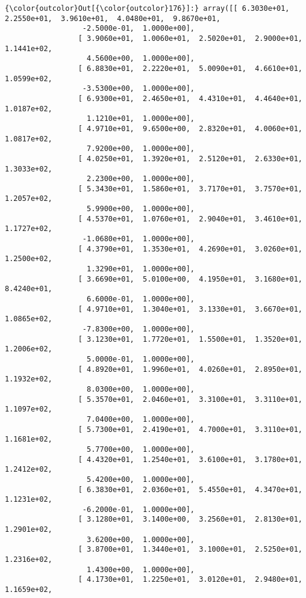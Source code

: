 \documentclass[11pt]{article}
\begin{document}
\begin{Verbatim}[commandchars=\\\{\}]
{\color{outcolor}Out[{\color{outcolor}176}]:} array([[ 6.3030e+01,  2.2550e+01,  3.9610e+01,  4.0480e+01,  9.8670e+01,
                  -2.5000e-01,  1.0000e+00],
                 [ 3.9060e+01,  1.0060e+01,  2.5020e+01,  2.9000e+01,  1.1441e+02,
                   4.5600e+00,  1.0000e+00],
                 [ 6.8830e+01,  2.2220e+01,  5.0090e+01,  4.6610e+01,  1.0599e+02,
                  -3.5300e+00,  1.0000e+00],
                 [ 6.9300e+01,  2.4650e+01,  4.4310e+01,  4.4640e+01,  1.0187e+02,
                   1.1210e+01,  1.0000e+00],
                 [ 4.9710e+01,  9.6500e+00,  2.8320e+01,  4.0060e+01,  1.0817e+02,
                   7.9200e+00,  1.0000e+00],
                 [ 4.0250e+01,  1.3920e+01,  2.5120e+01,  2.6330e+01,  1.3033e+02,
                   2.2300e+00,  1.0000e+00],
                 [ 5.3430e+01,  1.5860e+01,  3.7170e+01,  3.7570e+01,  1.2057e+02,
                   5.9900e+00,  1.0000e+00],
                 [ 4.5370e+01,  1.0760e+01,  2.9040e+01,  3.4610e+01,  1.1727e+02,
                  -1.0680e+01,  1.0000e+00],
                 [ 4.3790e+01,  1.3530e+01,  4.2690e+01,  3.0260e+01,  1.2500e+02,
                   1.3290e+01,  1.0000e+00],
                 [ 3.6690e+01,  5.0100e+00,  4.1950e+01,  3.1680e+01,  8.4240e+01,
                   6.6000e-01,  1.0000e+00],
                 [ 4.9710e+01,  1.3040e+01,  3.1330e+01,  3.6670e+01,  1.0865e+02,
                  -7.8300e+00,  1.0000e+00],
                 [ 3.1230e+01,  1.7720e+01,  1.5500e+01,  1.3520e+01,  1.2006e+02,
                   5.0000e-01,  1.0000e+00],
                 [ 4.8920e+01,  1.9960e+01,  4.0260e+01,  2.8950e+01,  1.1932e+02,
                   8.0300e+00,  1.0000e+00],
                 [ 5.3570e+01,  2.0460e+01,  3.3100e+01,  3.3110e+01,  1.1097e+02,
                   7.0400e+00,  1.0000e+00],
                 [ 5.7300e+01,  2.4190e+01,  4.7000e+01,  3.3110e+01,  1.1681e+02,
                   5.7700e+00,  1.0000e+00],
                 [ 4.4320e+01,  1.2540e+01,  3.6100e+01,  3.1780e+01,  1.2412e+02,
                   5.4200e+00,  1.0000e+00],
                 [ 6.3830e+01,  2.0360e+01,  5.4550e+01,  4.3470e+01,  1.1231e+02,
                  -6.2000e-01,  1.0000e+00],
                 [ 3.1280e+01,  3.1400e+00,  3.2560e+01,  2.8130e+01,  1.2901e+02,
                   3.6200e+00,  1.0000e+00],
                 [ 3.8700e+01,  1.3440e+01,  3.1000e+01,  2.5250e+01,  1.2316e+02,
                   1.4300e+00,  1.0000e+00],
                 [ 4.1730e+01,  1.2250e+01,  3.0120e+01,  2.9480e+01,  1.1659e+02,

\end{Verbatim}
\end{document}
